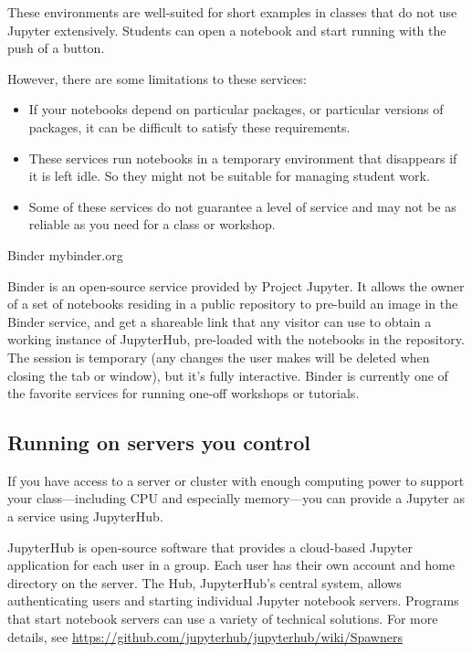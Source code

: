 \documentclass[]{book}
\begin{document}
These environments are well-suited for short examples in classes that do
not use Jupyter extensively. Students can open a notebook and start
running with the push of a button.

However, there are some limitations to these services:

\begin{itemize}
\item
  If your notebooks depend on particular packages, or particular
  versions of packages, it can be difficult to satisfy these
  requirements.
\item
  These services run notebooks in a temporary environment that
  disappears if it is left idle. So they might not be suitable for
  managing student work.
\item
  Some of these services do not guarantee a level of service and may not
  be as reliable as you need for a class or workshop.
\end{itemize}

Binder mybinder.org

Binder is an open-source service provided by Project Jupyter. It allows
the owner of a set of notebooks residing in a public repository to
pre-build an image in the Binder service, and get a shareable link that
any visitor can use to obtain a working instance of JupyterHub,
pre-loaded with the notebooks in the repository. The session is
temporary (any changes the user makes will be deleted when closing the
tab or window), but it's fully interactive. Binder is currently one of
the favorite services for running one-off workshops or tutorials.

\subsection{Running on servers you
control}\label{running-on-servers-you-control}

If you have access to a server or cluster with enough computing power to
support your class---including CPU and especially memory---you can
provide a Jupyter as a service using JupyterHub.

JupyterHub is open-source software that provides a cloud-based Jupyter
application for each user in a group. Each user has their own account
and home directory on the server. The Hub, JupyterHub's central system,
allows authenticating users and starting individual Jupyter notebook
servers. Programs that start notebook servers can use a variety of
technical solutions. For more details, see
\url{https://github.com/jupyterhub/jupyterhub/wiki/Spawners}
\end{document}
